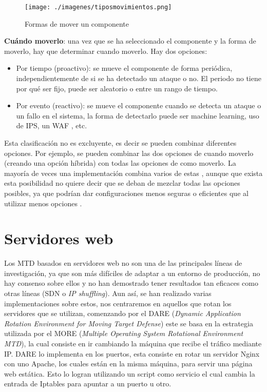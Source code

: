 \begin{figure}[h]
    \centering
    \texttt{[image: ./imagenes/tiposmovimientos.png]}
    \caption{Formas de mover un componente\cite{big-state-of-art}}
\end{figure}

\textbf{Cuándo moverlo}: una vez que se ha seleccionado el componente y la forma de moverlo, hay que determinar cuando moverlo. Hay dos opciones:
\begin{itemize}
    \item Por tiempo (proactivo): se mueve el componente de forma periódica, independientemente de si se ha detectado un ataque o no. El periodo no tiene por qué ser fijo, puede ser aleatorio o entre un rango de tiempo.
    \item Por evento (reactivo): se mueve el componente cuando se detecta un ataque o un fallo en el sistema, la forma de detectarlo puede ser machine learning\cite{MTD-ML}, uso de IPS\cite{Design-Generic-Intrusion-Tolerant-Architecture}, un WAF \cite{MTD-WAF}, etc.
\end{itemize}

Esta clasificación no es excluyente, es decir se pueden combinar diferentes opciones. Por ejemplo, se pueden combinar las dos opciones de cuando moverlo (creando una opción híbrida) con todas las opciones de como moverlo. La mayoría de veces una implementación combina varios de estas \cite{MTD-MORE+DARE+Java}\cite{MTD-DARE}\cite{MTD-arab}, aunque que exista esta posibilidad no quiere decir que se deban de mezclar todas las opciones posibles, ya que podrían dar configuraciones menos seguras o eficientes que al utilizar menos opciones \cite{MTD-comparativa-gorda}.

\section{Servidores web}
Los MTD basados en servidores web no son una de las principales líneas de investigación, ya que son más difíciles de adaptar a un entorno de producción, no hay consenso sobre ellos y no han demostrado tener resultados tan eficaces como otras líneas (SDN\cite{MTD-SDN+decoy} o \textit{IP shuffling\cite{MTD-ipshuffling+honeypots}}).
Aun así, se han realizado varias implementaciones sobre estos, nos centraremos en aquellos que rotan los servidores que se utilizan, comenzando por el DARE (\textit{Dynamic Application Rotation Environment for Moving Target Defense}\cite{MTD-DARE}) este se basa en la estrategia utilizada por el MORE (\textit{Multiple Operating System Rotational Environment MTD})\cite{MORE}, la cual consiste en ir cambiando la máquina que recibe el tráfico mediante IP.
DARE lo implementa en los puertos, esta consiste en rotar un servidor Nginx\cite{nginx} con uno Apache\cite{apache}, los cuales están en la misma máquina, para servir una página web estática. Esto lo logran utilizando un script como servicio el cual cambia la entrada de Iptables\cite{iptables} para apuntar a un puerto u otro.

